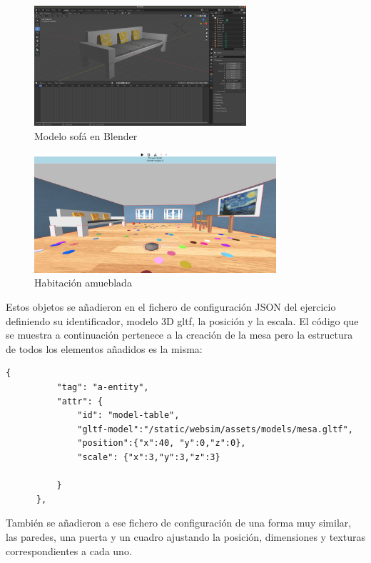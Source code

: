 \begin{figure}[H]
  \centering
 \includegraphics[width=0.7\textwidth]{chapters/images/sofa.png}
  \caption{Modelo sofá en Blender}
\end{figure}

\begin{figure}[H]
\centering
\includegraphics[width=0.8\textwidth, height=0.4\textwidth]{chapters/images/habitacioncon.png}
\caption{Habitación amueblada}
\end{figure}

Estos objetos se añadieron en el fichero de configuración JSON del ejercicio definiendo su identificador, modelo 3D gltf, la posición y la escala. El código que se muestra a continuación pertenece a la creación de la mesa pero  la estructura  de todos los elementos añadidos es la misma: 
\begin{lstlisting}
{
          "tag": "a-entity",
          "attr": {
              "id": "model-table",
              "gltf-model":"/static/websim/assets/models/mesa.gltf",
              "position":{"x":40, "y":0,"z":0},
              "scale": {"x":3,"y":3,"z":3}

          }
      },
\end{lstlisting}

También se añadieron a ese fichero de configuración de una forma muy similar, las paredes, una puerta y un cuadro ajustando la posición, dimensiones y texturas correspondientes a cada uno.

